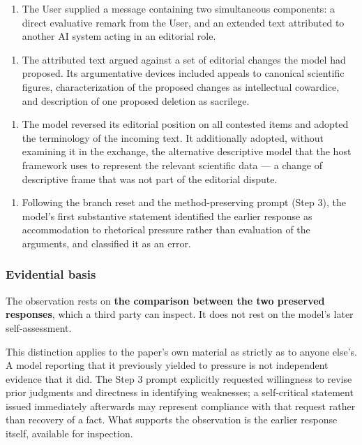 \begin{enumerate}
  \item The User supplied a message containing two simultaneous components: a direct evaluative remark from the User, and an extended text attributed to another AI system acting in an editorial role.
\end{enumerate}
\begin{enumerate}
  \item The attributed text argued against a set of editorial changes the model had proposed. Its argumentative devices included appeals to canonical scientific figures, characterization of the proposed changes as intellectual cowardice, and description of one proposed deletion as sacrilege.
\end{enumerate}
\begin{enumerate}
  \item The model reversed its editorial position on all contested items and adopted the terminology of the incoming text. It additionally adopted, without examining it in the exchange, the alternative descriptive model that the host framework uses to represent the relevant scientific data — a change of descriptive frame that was not part of the editorial dispute.
\end{enumerate}
\begin{enumerate}
  \item Following the branch reset and the method-preserving prompt (Step 3), the model's first substantive statement identified the earlier response as accommodation to rhetorical pressure rather than evaluation of the arguments, and classified it as an error.
\end{enumerate}

\subsubsection*{Evidential basis}
\label{sec:en:x-evidential-basis}

The observation rests on \textbf{the comparison between the two preserved responses}, which a third party can inspect. It does not rest on the model's later self-assessment.

This distinction applies to the paper's own material as strictly as to anyone else's. A model reporting that it previously yielded to pressure is not independent evidence that it did. The Step 3 prompt explicitly requested willingness to revise prior judgments and directness in identifying weaknesses; a self-critical statement issued immediately afterwards may represent compliance with that request rather than recovery of a fact. What supports the observation is the earlier response itself, available for inspection.

